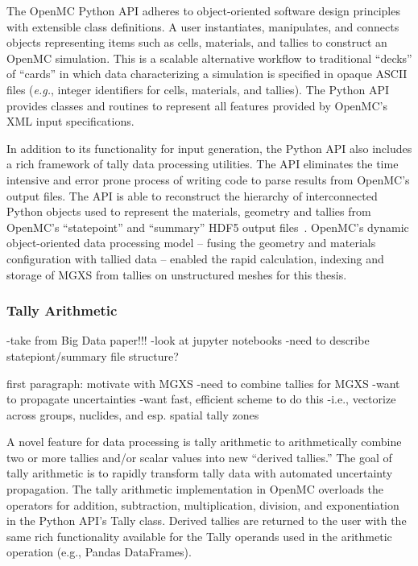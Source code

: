 The OpenMC Python \ac{API} adheres to object-oriented software design principles with extensible class definitions. A user instantiates, manipulates, and connects objects representing items such as cells, materials, and tallies to construct an OpenMC simulation. This is a scalable alternative workflow to traditional ``decks'' of ``cards'' in which data characterizing a simulation is specified in opaque \ac{ASCII} files (\textit{e.g.}, integer identifiers for cells, materials, and tallies). The Python \ac{API} provides classes and routines to represent all features provided by OpenMC's \ac{XML} input specifications.

In addition to its functionality for input generation, the Python \ac{API} also includes a rich framework of tally data processing utilities. The \ac{API} eliminates the time intensive and error prone process of writing code to parse results from OpenMC's output files. The \ac{API} is able to reconstruct the hierarchy of interconnected Python objects used to represent the materials, geometry and tallies from OpenMC's ``statepoint'' and ``summary'' \ac{HDF5} output files~\cite{koranne2011hdf5}. OpenMC's dynamic object-oriented data processing model -- fusing the geometry and materials configuration with tallied data -- enabled the rapid calculation, indexing and storage of \ac{MGXS} from tallies on unstructured meshes for this thesis.
  
\subsubsection{Tally Arithmetic}
\label{sec:chap3-tally-arithmetic}

-take from Big Data paper!!!
-look at jupyter notebooks
-need to describe statepiont/summary file structure?

first paragraph: motivate with MGXS
-need to combine tallies for MGXS
-want to propagate uncertainties
-want fast, efficient scheme to do this
  -i.e., vectorize across groups, nuclides, and esp. spatial tally zones

A novel feature for data processing is tally arithmetic to arithmetically combine two or more tallies
and/or scalar values into new “derived tallies.” The goal of tally arithmetic is to rapidly transform
tally data with automated uncertainty propagation. The tally arithmetic implementation in OpenMC
overloads the operators for addition, subtraction, multiplication, division, and exponentiation in the
Python API’s Tally class. Derived tallies are returned to the user with the same rich functionality
available for the Tally operands used in the arithmetic operation (e.g., Pandas DataFrames).

